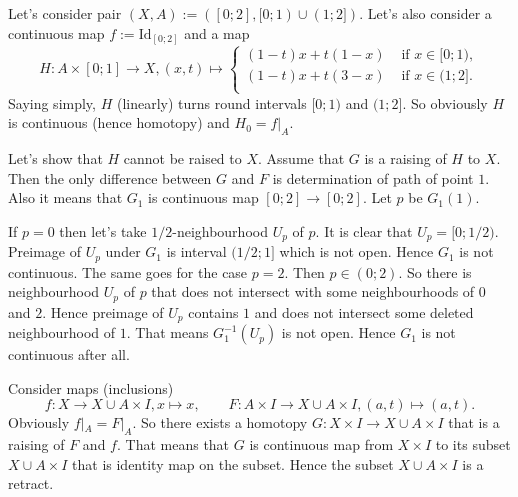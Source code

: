 \documentclass[12pt,a4paper]{article}
\newcommand{\Id}{\mathrm{Id}}
\begin{document}
    \begin{enumproblem}
        Let's consider pair $(X, A) := ([0; 2], [0; 1) \cup (1; 2])$. Let's also consider a continuous map $f := \Id_{[0; 2]}$ and a map
        \[
            H: A \times [0; 1] \to X, (x, t) \mapsto
            \begin{cases}
                (1-t)x + t(1-x)& \text{ if } x \in [0; 1),\\
                (1-t)x + t(3-x)& \text{ if } x \in (1; 2].\\
            \end{cases}
        \]
        Saying simply, $H$ (linearly) turns round intervals $[0; 1)$ and $(1; 2]$. So obviously $H$ is continuous (hence homotopy) and $H_0 = f|_A$.

        Let's show that $H$ cannot be raised to $X$. Assume that $G$ is a raising of $H$ to $X$. Then the only difference between $G$ and $F$ is determination of path of point $1$. Also it means that $G_1$ is continuous map $[0; 2] \to [0; 2]$. Let $p$ be $G_1(1)$.
        
        If $p=0$ then let's take $1/2$-neighbourhood $U_p$ of $p$. It is clear that $U_p = [0; 1/2)$. Preimage of $U_p$ under $G_1$ is interval $(1/2; 1]$ which is not open. Hence $G_1$ is not continuous. The same goes for the case $p = 2$. Then $p \in (0; 2)$. So there is neighbourhood $U_p$ of $p$ that does not intersect with some neighbourhoods of $0$ and $2$. Hence preimage of $U_p$ contains $1$ and does not intersect some deleted neighbourhood of $1$. That means $G_1^{-1}(U_p)$ is not open. Hence $G_1$ is not continuous after all.
    \end{enumproblem}

    \begin{enumproblem}
        Consider maps (inclusions)
        \[
            f: X \to X \cup A \times I, x \mapsto x,
            \qquad
            F: A \times I \to X \cup A \times I, (a, t) \mapsto (a, t).
        \]
        Obviously $f|_A = F|_A$. So there exists a homotopy $G: X \times I \to X \cup A \times I$ that is a raising of $F$ and $f$. That means that $G$ is continuous map from $X \times I$ to its subset $X \cup A \times I$ that is identity map on the subset. Hence the subset $X \cup A \times I$ is a retract.
    \end{enumproblem}
\end{document}
